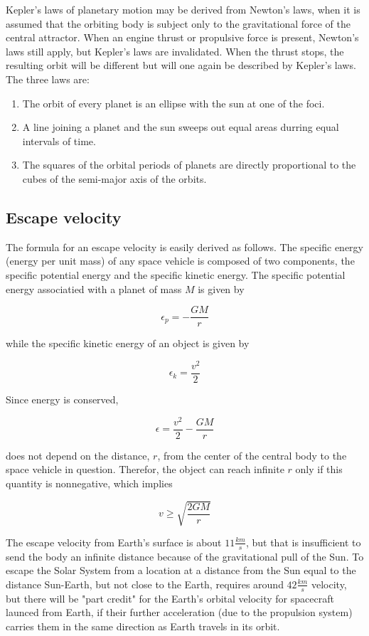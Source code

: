 \documentclass{article}
\begin{document}
Kepler's laws of planetary motion may be derived from Newton's laws, when it is assumed that the orbiting body is subject only to the gravitational force of the central attractor. When an engine thrust or propulsive force is present, Newton's laws still apply, but Kepler's laws are invalidated. When the thrust stops, the resulting orbit will be different but will one again be described by Kepler's laws. The three laws are:

\begin{enumerate}
\item The orbit of every planet is an ellipse with the sun at one of the foci.
\item A line joining a planet and the sun sweeps out equal areas durring equal intervals of time.
\item The squares of the orbital periods of planets are directly proportional to the cubes of the semi-major axis of the orbits.
\end{enumerate}
\subsection{Escape velocity}
The formula for an escape velocity is easily derived as follows. The specific energy (energy per unit mass) of any space vehicle is composed of two components, the specific potential energy and the specific kinetic energy. The specific potential energy associatied with a planet of mass \(M\) is given by

\[\epsilon_{p}=-\frac{GM}{r}\]

while the specific kinetic energy of an object is given by

\[\epsilon_{k}=\frac{v^{2}}{2}\]

Since energy is conserved,

\[\epsilon=\frac{v^{2}}{2}-\frac{GM}{r}\]

does not depend on the distance, \(r\), from the center of the central body to the space vehicle in question. Therefor, the object can reach infinite \(r\) only if this quantity is nonnegative, which implies

\[v\geq\sqrt{\frac{2GM}{r}}\]

The escape velocity from Earth's surface is about \(11\frac{km}{s}\), but that is insufficient to send the body an infinite distance because of the gravitational pull of the Sun. To escape the Solar System from a location at a distance from the Sun equal to the distance Sun-Earth, but not close to the Earth, requires around \(42\frac{km}{s}\) velocity, but there will be "part credit" for the Earth's orbital velocity for spacecraft launced from Earth, if their further acceleration (due to the propulsion system) carries them in the same direction as Earth travels in its orbit.
\end{document}
